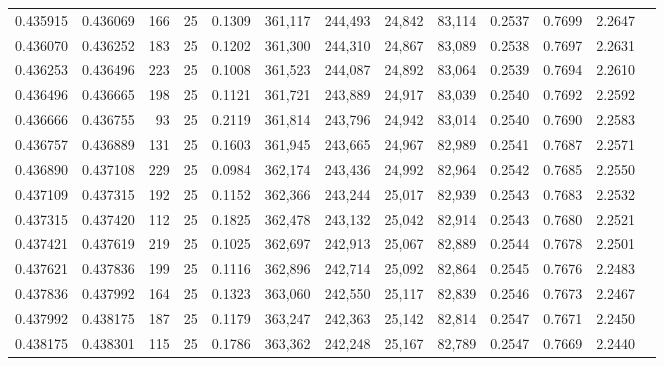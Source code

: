 \begin{tabular}{rrrrrrrrrrrrr}
0.435915 & 0.436069 &   166 &  25 &                                     0.1309 & 361,117 & 244,493 &  24,842 &  83,114 & 0.2537 & 0.7699 & 2.2647 \\
0.436070 & 0.436252 &   183 &  25 &                                     0.1202 & 361,300 & 244,310 &  24,867 &  83,089 & 0.2538 & 0.7697 & 2.2631 \\
0.436253 & 0.436496 &   223 &  25 &                                     0.1008 & 361,523 & 244,087 &  24,892 &  83,064 & 0.2539 & 0.7694 & 2.2610 \\
0.436496 & 0.436665 &   198 &  25 &                                     0.1121 & 361,721 & 243,889 &  24,917 &  83,039 & 0.2540 & 0.7692 & 2.2592 \\
0.436666 & 0.436755 &    93 &  25 &                                     0.2119 & 361,814 & 243,796 &  24,942 &  83,014 & 0.2540 & 0.7690 & 2.2583 \\
0.436757 & 0.436889 &   131 &  25 &                                     0.1603 & 361,945 & 243,665 &  24,967 &  82,989 & 0.2541 & 0.7687 & 2.2571 \\
0.436890 & 0.437108 &   229 &  25 &                                     0.0984 & 362,174 & 243,436 &  24,992 &  82,964 & 0.2542 & 0.7685 & 2.2550 \\
0.437109 & 0.437315 &   192 &  25 &                                     0.1152 & 362,366 & 243,244 &  25,017 &  82,939 & 0.2543 & 0.7683 & 2.2532 \\
0.437315 & 0.437420 &   112 &  25 &                                     0.1825 & 362,478 & 243,132 &  25,042 &  82,914 & 0.2543 & 0.7680 & 2.2521 \\
0.437421 & 0.437619 &   219 &  25 &                                     0.1025 & 362,697 & 242,913 &  25,067 &  82,889 & 0.2544 & 0.7678 & 2.2501 \\
0.437621 & 0.437836 &   199 &  25 &                                     0.1116 & 362,896 & 242,714 &  25,092 &  82,864 & 0.2545 & 0.7676 & 2.2483 \\
0.437836 & 0.437992 &   164 &  25 &                                     0.1323 & 363,060 & 242,550 &  25,117 &  82,839 & 0.2546 & 0.7673 & 2.2467 \\
0.437992 & 0.438175 &   187 &  25 &                                     0.1179 & 363,247 & 242,363 &  25,142 &  82,814 & 0.2547 & 0.7671 & 2.2450 \\
0.438175 & 0.438301 &   115 &  25 &                                     0.1786 & 363,362 & 242,248 &  25,167 &  82,789 & 0.2547 & 0.7669 & 2.2440 \\

\end{tabular}
